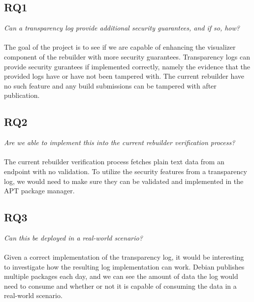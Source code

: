 \documentclass[../Main/thesis.tex]{subfiles}
\begin{document}
\subsection*{RQ1}%
\label{sub:rq1}
\textit{Can a transparency log provide additional security guarantees, and if so, how?}
\\\\
The goal of the project is to see if we are capable of enhancing the visualizer
component of the rebuilder with more security guarantees. Transparency logs can
provide security gurantees if implemented correctly, namely the evidence that
the provided logs have or have not been tampered with. The current rebuilder
have no such feature and any build submissions can be tampered with after
publication.

\subsection*{RQ2}%
\label{sub:rq2}
\textit{Are we able to implement this into the current rebuilder verification process?}
\\\\
The current rebuilder verification process fetches plain text data from an
endpoint with no validation. To utilize the security features from a
transparency log, we would need to make sure they can be validated and
implemented in the APT package manager.

\subsection*{RQ3}%
\label{sub:rq3}
\textit{Can this be deployed in a real-world scenario?}
\\\\
Given a correct implementation of the transparency log, it would be interesting
to investigate how the resulting log implementation can work. Debian publishes
multiple packages each day, and we can see the amount of data the log would need
to consume and whether or not it is capable of consuming the data in a
real-world scenario.

\blankpage
\end{document}
